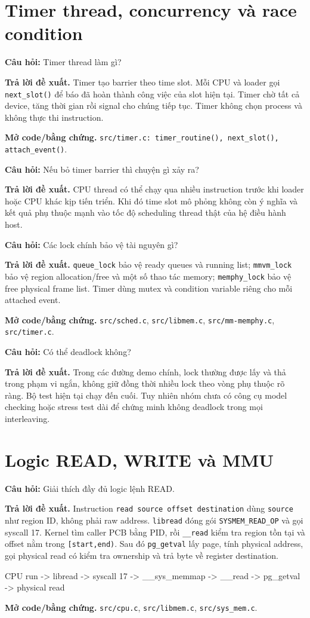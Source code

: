 \documentclass[11pt,a4paper]{article}
\newcommand{\code}[1]{\texttt{\color{navy}#1}}
\newcommand{\q}[1]{%
  \vspace{0.55em}\noindent
  \colorbox{pale}{\parbox{\dimexpr\textwidth-2\fboxsep}{\textbf{\color{navy}Câu hỏi:} #1}}%
  \par\vspace{0.3em}}
\newcommand{\ans}[1]{\textbf{\color{cyan}Trả lời đề xuất.} #1\par}
\newcommand{\proofcode}[1]{\textbf{\color{orange}Mở code/bằng chứng.} #1\par}
\newcommand{\flow}[1]{%
  \begin{center}
  \colorbox{pale}{\parbox{0.94\textwidth}{\centering\ttfamily\color{navy}#1}}
  \end{center}}
\begin{document}
\section{Timer thread, concurrency và race condition}

\q{Timer thread làm gì?}
\ans{Timer tạo barrier theo time slot. Mỗi CPU và loader gọi
\code{next\_slot()} để báo đã hoàn thành công việc của slot hiện tại. Timer chờ
tất cả device, tăng thời gian rồi signal cho chúng tiếp tục. Timer không chọn
process và không thực thi instruction.}
\proofcode{\code{src/timer.c: timer\_routine(), next\_slot(), attach\_event()}.}

\q{Nếu bỏ timer barrier thì chuyện gì xảy ra?}
\ans{CPU thread có thể chạy qua nhiều instruction trước khi loader hoặc CPU
khác kịp tiến triển. Khi đó time slot mô phỏng không còn ý nghĩa và kết quả phụ
thuộc mạnh vào tốc độ scheduling thread thật của hệ điều hành host.}

\q{Các lock chính bảo vệ tài nguyên gì?}
\ans{\code{queue\_lock} bảo vệ ready queues và running list;
\code{mmvm\_lock} bảo vệ region allocation/free và một số thao tác memory;
\code{memphy\_lock} bảo vệ free physical frame list. Timer dùng mutex và
condition variable riêng cho mỗi attached event.}
\proofcode{\code{src/sched.c}, \code{src/libmem.c}, \code{src/mm-memphy.c},
\code{src/timer.c}.}

\q{Có thể deadlock không?}
\ans{Trong các đường demo chính, lock thường được lấy và thả trong phạm vi ngắn,
không giữ đồng thời nhiều lock theo vòng phụ thuộc rõ ràng. Bộ test hiện tại
chạy đến cuối. Tuy nhiên nhóm chưa có công cụ model checking hoặc stress test
dài để chứng minh không deadlock trong mọi interleaving.}

\section{Logic READ, WRITE và MMU}

\q{Giải thích đầy đủ logic lệnh READ.}
\ans{Instruction \code{read source offset destination} dùng \code{source} như
region ID, không phải raw address. \code{libread} đóng gói
\code{SYSMEM\_READ\_OP} và gọi syscall 17. Kernel tìm caller PCB bằng PID, rồi
\code{\_\_read} kiểm tra region tồn tại và offset nằm trong
\code{[start,end)}. Sau đó \code{pg\_getval} lấy page, tính physical address,
gọi physical read có kiểm tra ownership và trả byte về register destination.}
\flow{CPU run -> libread -> syscall 17 -> \_\_sys\_memmap -> \_\_read -> pg\_getval -> physical read}
\proofcode{\code{src/cpu.c}, \code{src/libmem.c}, \code{src/sys\_mem.c}.}
\end{document}
